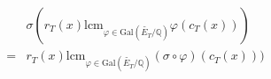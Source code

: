 \documentclass[preview]{standalone}
\begin{document}
\begin{center}
\begin{align*} &\sigma(r_T(x) \text{lcm}_{\varphi \in \text{Gal}\left(\widetilde{E_T}/\mathbb{Q}\right)} \varphi(c_T(x))) \\ = & r_T(x)\text{lcm}_{\varphi \in \text{Gal}\left(\widetilde{E_T}/\mathbb{Q}\right)} (\sigma \circ \varphi)(c_T(x)))  \end{align*}
\end{center}
\end{document}
